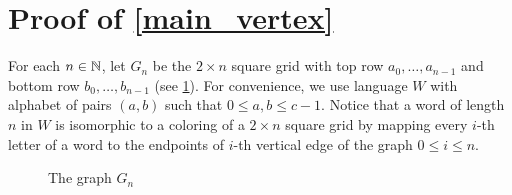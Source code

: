 \documentclass{patmorin}
\begin{document}



\section{Proof of \cref{main_vertex}}
\label{vertex_colourings}

For each $n\in\mathbb{N}$, let $G_n$ be the $2\times n$ square grid with top row $a_0,\ldots,a_{n-1}$ and bottom row $b_0,\ldots,b_{n-1}$ (see \cref{g_n}). For convenience, we use language $W$ with alphabet of pairs $(a, b)$ such that $0\le a, b\le c-1$. Notice that a word of length $n$ in $W$ is isomorphic to a coloring of a $2\times n$ square grid by mapping every $i$-th letter of a word to the endpoints of $i$-th vertical edge of the graph $0 \le i \le n$.

\begin{figure}
    \caption{The graph $G_n$}
    \label{g_n}
\end{figure}


\end{document}
